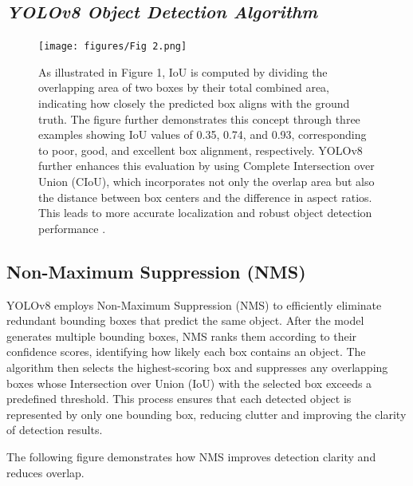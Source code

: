 \begin{refsection}
\section*{\textbf{\textit{ YOLOv8 Object Detection Algorithm}}}
\begin{figure}[ht]
    \centering
	\texttt{[image: figures/Fig 2.png]} 
	\caption[ Intersection over Union ]{As illustrated in Figure 1, IoU is computed by dividing the overlapping area of two boxes by their total combined area, indicating how closely the predicted box aligns with the ground truth. The figure further demonstrates this concept through three examples showing IoU values of 0.35, 0.74, and 0.93, corresponding to poor, good, and excellent box alignment, respectively. YOLOv8 further enhances this evaluation by using Complete Intersection over Union (CIoU), which incorporates not only the overlap area but also the distance between box centers and the difference in aspect ratios. This leads to more accurate localization and robust object detection performance \cite{Terven2023}.}
	\label{fig:firstFig}
\end{figure}

\subsection*{Non-Maximum Suppression (NMS)}

YOLOv8 employs Non-Maximum Suppression (NMS) to efficiently eliminate redundant bounding boxes that predict the same object. After the model generates multiple bounding boxes, NMS ranks them according to their confidence scores, identifying how likely each box contains an object. The algorithm then selects the highest-scoring box and suppresses any overlapping boxes whose Intersection over Union (IoU) with the selected box exceeds a predefined threshold. This process ensures that each detected object is represented by only one bounding box, reducing clutter and improving the clarity of detection results. 

The following figure demonstrates how NMS improves detection clarity and reduces overlap.


\end{refsection}
